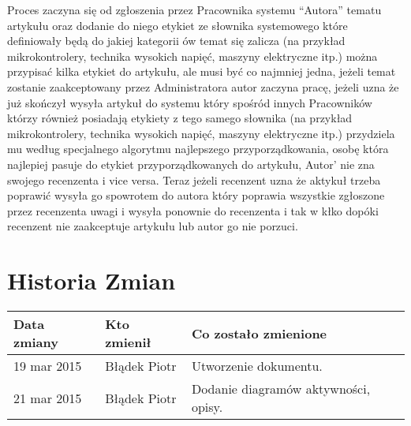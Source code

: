 Proces zaczyna się od zgłoszenia przez Pracownika systemu ``Autora'' tematu artykułu oraz dodanie do niego etykiet ze słownika systemowego które definiowały będą do jakiej kategorii ów temat się zalicza (na przykład mikrokontrolery, technika wysokich napięć, maszyny elektryczne itp.) można przypisać kilka etykiet do artykułu, ale musi być co najmniej jedna, jeżeli temat zostanie zaakceptowany przez Administratora autor zaczyna pracę, jeżeli uzna że już skończył wysyła artykuł do systemu który spośród innych Pracowników którzy również posiadają etykiety z tego samego słownika  (na przykład mikrokontrolery, technika wysokich napięć, maszyny elektryczne itp.)  przydziela mu według specjalnego algorytmu najlepszego przyporządkowania, osobę która najlepiej pasuje do etykiet przyporządkowanych do artykułu, Autor' nie zna swojego recenzenta i vice versa. Teraz jeżeli recenzent uzna że aktykuł trzeba poprawić wysyła go spowrotem do autora który poprawia wszystkie zgłoszone przez recenzenta uwagi i wysyła ponownie do recenzenta i tak w kłko dopóki recenzent nie zaakceptuje artykułu lub autor go nie porzuci.

\section{Historia Zmian}

\begin{tabularx}{\textwidth}{X|l|X}
\hline
\textbf{Data zmiany} & \textbf{Kto zmienił} & \textbf{Co zostało zmienione} \\ \hline
19 mar 2015          & Błądek Piotr         & Utworzenie dokumentu.          \\ \hline
21 mar 2015          & Błądek Piotr         & Dodanie diagramów aktywności, opisy.       \\ \hline
\end{tabularx}